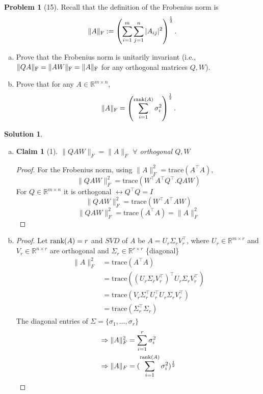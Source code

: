 \documentclass{amsart}[11pt]
\newtheorem*{claim}{Claim}
\theoremstyle{definition}
\newtheorem*{problem}{Problem}
\newtheorem*{solution}{Solution}
\newcommand{\R}{\mathbb{R}}
\newcommand{\rank}{\textnormal{rank}}
\newcommand{\fro}{\textnormal{F}}
\begin{document}
\begin{problem}[15]
Recall that the definition of the Frobenius norm is \[\|A\|_{\fro}:=\left(\sum_{i=1}^m\sum_{j=1}^n|A_{ij}|^2\right)^\frac12.\]
\begin{enumerate}[(a)]
\item Prove that the Frobenius norm is unitarily invariant (i.e., $\|QA\|_{\fro} = \|AW\|_{\fro} = \|A\|_{\fro}$ for any orthogonal matrices $Q,W$). \item Prove that for any $A\in\R^{m\times n}$,
 \[\|A\|_{\fro} = \left(\sum_{i=1}^{\rank(A)} \sigma_i^2\right)^\frac12.\]
\end{enumerate}
\begin{solution}
    \begin{enumerate}[(a)]
        \item \begin{claim}[1]
            $\|QAW\|_F=\|A\|_F$ $\forall$ orthogonal $Q,W$
        \end{claim}
        \begin{proof}
            For the Frobenius norm, using $\|A\|_F^{2} = \mathrm{trace}(A^\top A),$
            \[\|QAW\|_F^{2}=\mathrm{trace}(W^\top A^\top Q^\top.QAW)\] For $Q\in\R^{m\times n}$ it is orthogonal $\leftrightarrow Q^\top Q = I$
            \[\|QAW\|_F^{2}=\mathrm{trace}(W^\top A^\top AW)\]
            \[\|QAW\|_F^{2}=\mathrm{trace}( A^\top A) = \|A\|_F^{2}\]
        \end{proof} 
        \vspace{\baselineskip}
        \item \begin{proof}
            Let $\rank(A)=r$ and $SVD$ of $A$ be $A=U_r\Sigma_r V_r^\top$, where $U_r\in\R^{m\times r}$ and $V_r\in\R^{n\times r}$ are orthogonal and $\Sigma_r \in\R^{r\times r}$ \{diagonal\}
            \begin{align*}
            \|A\|_F^2&=\mathrm{trace}(A^\top A) \\
            &=\mathrm{trace}((U_r\Sigma_r V_r^\top)^\top U_r\Sigma_r V_r^\top) \\
            &= \mathrm{trace}(V_r\Sigma_r^\top U_r^\top U_r\Sigma_r V_r^\top) \\
            &= \mathrm{trace}(\Sigma_r^\top \Sigma_r)
            \end{align*}
            The diagonal entries of $\Sigma = \{\sigma_1,\dots,\sigma_r\}$
            \begin{align*}
            \Rightarrow\|A\|_F^2&=\sum_{i=1}^{r}\sigma_{i}^{2} \\
            \Rightarrow\|A\|_F&=(\sum_{i=1}^{\rank(A)}\sigma_{i}^{2})^{\frac{1}{2}}
            \end{align*}
        \end{proof}
    \end{enumerate}
\end{solution}
\end{problem}
\end{document}
